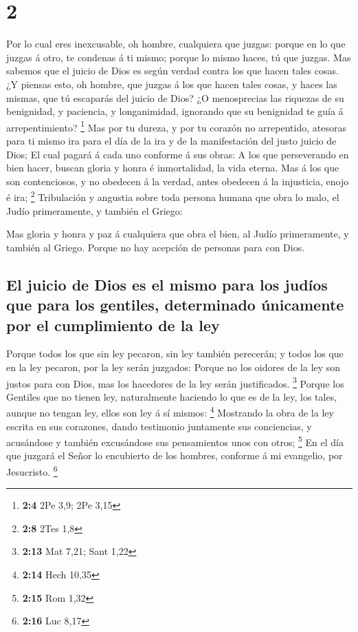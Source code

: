 \hypertarget{section-1}{%
\section{2}\label{section-1}}

 Por lo cual eres inexcusable, oh hombre, cualquiera que
juzgas: porque en lo que juzgas á otro, te condenas á ti mismo; porque
lo mismo haces, tú que juzgas.  Mas sabemos que el juicio de
Dios es según verdad contra los que hacen tales cosas.  ¿Y
piensas esto, oh hombre, que juzgas á los que hacen tales cosas, y haces
las mismas, que tú escaparás del juicio de Dios?  ¿O
menosprecias las riquezas de su benignidad, y paciencia, y longanimidad,
ignorando que su benignidad te guía á arrepentimiento? \footnote{\textbf{2:4}
  2Pe 3,9; 2Pe 3,15}  Mas por tu dureza, y por tu corazón no
arrepentido, atesoras para ti mismo ira para el día de la ira y de la
manifestación del justo juicio de Dios;  El cual pagará á
cada uno conforme á sus obras:  A los que perseverando en
bien hacer, buscan gloria y honra é inmortalidad, la vida eterna.
 Mas á los que son contenciosos, y no obedecen á la verdad,
antes obedecen á la injusticia, enojo é ira; \footnote{\textbf{2:8} 2Tes
  1,8}  Tribulación y angustia sobre toda persona humana que
obra lo malo, el Judío primeramente, y también el Griego:

 Mas gloria y honra y paz á cualquiera que obra el bien, al
Judío primeramente, y también al Griego.  Porque no hay
acepción de personas para con Dios.

\hypertarget{el-juicio-de-dios-es-el-mismo-para-los-juduxedos-que-para-los-gentiles-determinado-uxfanicamente-por-el-cumplimiento-de-la-ley}{%
\subsection{El juicio de Dios es el mismo para los judíos que para los
gentiles, determinado únicamente por el cumplimiento de la
ley}\label{el-juicio-de-dios-es-el-mismo-para-los-juduxedos-que-para-los-gentiles-determinado-uxfanicamente-por-el-cumplimiento-de-la-ley}}

 Porque todos los que sin ley pecaron, sin ley también
perecerán; y todos los que en la ley pecaron, por la ley serán juzgados:
 Porque no los oidores de la ley son justos para con Dios,
mas los hacedores de la ley serán justificados. \footnote{\textbf{2:13}
  Mat 7,21; Sant 1,22}  Porque los Gentiles que no tienen
ley, naturalmente haciendo lo que es de la ley, los tales, aunque no
tengan ley, ellos son ley á sí mismos: \footnote{\textbf{2:14} Hech
  10,35}  Mostrando la obra de la ley escrita en sus
corazones, dando testimonio juntamente sus conciencias, y acusándose y
también excusándose sus pensamientos unos con otros; \footnote{\textbf{2:15}
  Rom 1,32}  En el día que juzgará el Señor lo encubierto
de los hombres, conforme á mi evangelio, por Jesucristo. \footnote{\textbf{2:16}
  Luc 8,17}

